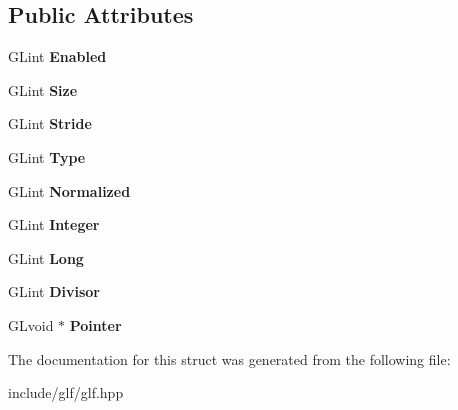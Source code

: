 \subsection*{\-Public \-Attributes}
\begin{DoxyCompactItemize}
\item 
\hypertarget{structglf_1_1vertexattrib_ae6e0dd40ba6863f15c64313da4862edc}{\-G\-Lint {\bfseries \-Enabled}}\label{structglf_1_1vertexattrib_ae6e0dd40ba6863f15c64313da4862edc}

\item 
\hypertarget{structglf_1_1vertexattrib_a4b74c71d833118e6c80d417530bf9fc8}{\-G\-Lint {\bfseries \-Size}}\label{structglf_1_1vertexattrib_a4b74c71d833118e6c80d417530bf9fc8}

\item 
\hypertarget{structglf_1_1vertexattrib_aaec7ebcc678893cd4d058517640e1e63}{\-G\-Lint {\bfseries \-Stride}}\label{structglf_1_1vertexattrib_aaec7ebcc678893cd4d058517640e1e63}

\item 
\hypertarget{structglf_1_1vertexattrib_a270f5d6939dbd95300771c3566e24aba}{\-G\-Lint {\bfseries \-Type}}\label{structglf_1_1vertexattrib_a270f5d6939dbd95300771c3566e24aba}

\item 
\hypertarget{structglf_1_1vertexattrib_ad10dafa0d8a532b1e37b84f24998ae73}{\-G\-Lint {\bfseries \-Normalized}}\label{structglf_1_1vertexattrib_ad10dafa0d8a532b1e37b84f24998ae73}

\item 
\hypertarget{structglf_1_1vertexattrib_a8bf4c5bfba445f79bf1e634e1cf294af}{\-G\-Lint {\bfseries \-Integer}}\label{structglf_1_1vertexattrib_a8bf4c5bfba445f79bf1e634e1cf294af}

\item 
\hypertarget{structglf_1_1vertexattrib_a5671c11c2ec68ce1e5b1408feca13bd4}{\-G\-Lint {\bfseries \-Long}}\label{structglf_1_1vertexattrib_a5671c11c2ec68ce1e5b1408feca13bd4}

\item 
\hypertarget{structglf_1_1vertexattrib_aeef2520b2a425875497365eb077e9bf2}{\-G\-Lint {\bfseries \-Divisor}}\label{structglf_1_1vertexattrib_aeef2520b2a425875497365eb077e9bf2}

\item 
\hypertarget{structglf_1_1vertexattrib_a7176c5624933a1ac0a7a2390e1d22e82}{\-G\-Lvoid $\ast$ {\bfseries \-Pointer}}\label{structglf_1_1vertexattrib_a7176c5624933a1ac0a7a2390e1d22e82}

\end{DoxyCompactItemize}


\-The documentation for this struct was generated from the following file\-:\begin{DoxyCompactItemize}
\item 
include/glf/glf.\-hpp\end{DoxyCompactItemize}
